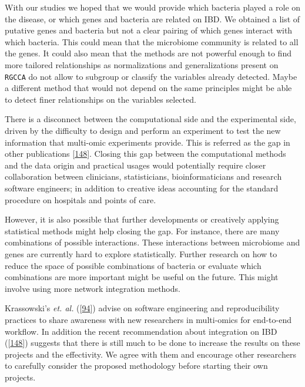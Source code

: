 \documentclass[
  12pt,
  a4paper,
  twoside,
  openright]{book}
\begin{document}
With our studies we hoped that we would provide which bacteria played a role on the disease, or which genes and bacteria are related on IBD.
We obtained a list of putative genes and bacteria but not a clear pairing of which genes interact with which bacteria.
This could mean that the microbiome community is related to all the genes.
It could also mean that the methods are not powerful enough to find more tailored relationships as normalizations and generalizations present on \texttt{RGCCA} do not allow to subgroup or classify the variables already detected.
Maybe a different method that would not depend on the same principles might be able to detect finer relationships on the variables selected.

There is a disconnect between the computational side and the experimental side, driven by the difficulty to design and perform an experiment to test the new information that multi-omic experiments provide.
This is referred as the gap in other publications {[}\protect\hyperlink{ref-sudhakar2022}{148}{]}.
Closing this gap between the computational methods and the data origin and practical usages would potentially require closer collaboration between clinicians, statisticians, bioinformaticians and research software engineers; in addition to creative ideas accounting for the standard procedure on hospitals and points of care.

However, it is also possible that further developments or creatively applying statistical methods might help closing the gap.
For instance, there are many combinations of possible interactions.
These interactions between microbiome and genes are currently hard to explore statistically.
Further research on how to reduce the space of possible combinations of bacteria or evaluate which combinations are more important might be useful on the future.
This might involve using more network integration methods.

Krassowski's \emph{et. al.} ({[}\protect\hyperlink{ref-krassowski2020}{94}{]}) advise on software engineering and reproducibility practices to share awareness with new researchers in multi-omics for end-to-end workflow.
In addition the recent recommendation about integration on IBD ({[}\protect\hyperlink{ref-sudhakar2022}{148}{]}) suggests that there is still much to be done to increase the results on these projects and the effectivity.
We agree with them and encourage other researchers to carefully consider the proposed methodology before starting their own projects.
\end{document}

